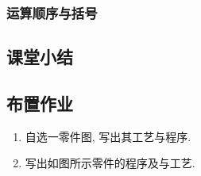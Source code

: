 \subsubsection{运算顺序与括号}
\subsection{课堂小结}
\vfill
\subsection{布置作业}
\begin{enumerate}[1、]
	\item 自选一零件图, 写出其工艺与程序.
	\item 写出如图所示零件的程序及与工艺.
\end{enumerate}
\vfill